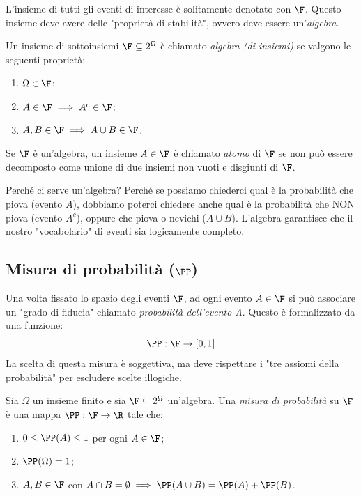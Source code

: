L'insieme di tutti gli eventi di interesse è solitamente denotato con $\F$. Questo insieme deve avere delle "proprietà di stabilità", ovvero deve essere un'\emph{algebra}.

\begin{definition}
Un insieme di sottoinsiemi $\F \subseteq 2^\Omega$ è chiamato \emph{algebra (di insiemi)} se valgono le seguenti proprietà:
\begin{enumerate}[(F1)]
    \item $\Omega \in \F$;
    \item $A \in \F \implies A^c \in \F$;
    \item $A, B \in \F \implies A \cup B \in \F$.
\end{enumerate}
Se $\F$ è un'algebra, un insieme $A \in \F$ è chiamato \emph{atomo} di $\F$ se non può essere decomposto come unione di due insiemi non vuoti e disgiunti di $\F$.
\end{definition}

\begin{spiegazione}
    Perché ci serve un'algebra? Perché se possiamo chiederci qual è la probabilità che piova (evento $A$), dobbiamo poterci chiedere anche qual è la probabilità che NON piova (evento $A^c$), oppure che piova o nevichi ($A \cup B$). L'algebra garantisce che il nostro "vocabolario" di eventi sia logicamente completo.
\end{spiegazione}

\subsection{Misura di probabilità ($\PP$)}

Una volta fissato lo spazio degli eventi $\F$, ad ogni evento $A \in \F$ si può associare un "grado di fiducia" chiamato \emph{probabilità dell'evento A}. Questo è formalizzato da una funzione:
\[ \PP : \F \to [0, 1] \]
La scelta di questa misura è soggettiva, ma deve rispettare i "tre assiomi della probabilità" per escludere scelte illogiche.

\begin{definition}
Sia $\Omega$ un insieme finito e sia $\F \subseteq 2^\Omega$ un'algebra. Una \emph{misura di probabilità} su $\F$ è una mappa $\PP : \F \to \R$ tale che:
\begin{enumerate}[(A1)]
    \item $0 \le \PP(A) \le 1$ per ogni $A \in \F$;
    \item $\PP(\Omega) = 1$;
    \item $A, B \in \F$ con $A \cap B = \emptyset \implies \PP(A \cup B) = \PP(A) + \PP(B)$.
\end{enumerate}
\end{definition}

